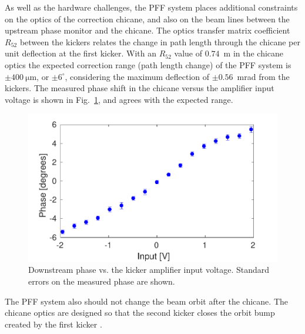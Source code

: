 \documentclass[%
 reprint,
superscriptaddress,
 amsmath,amssymb,
 prl,
]{revtex4-1}
\begin{document}
As well as the hardware challenges, the PFF system places additional 
constraints on the optics of the correction 
chicane, and also on the beam lines between the upstream phase monitor and the 
chicane. %
The optics transfer matrix coefficient \(R_{52}\) between the kickers relates 
the change in path length through the chicane per unit 
deflection at the first kicker. 
With an \(R_{52}\) value of \(0.74\)~m in the chicane optics 
\cite{RobertsThesis} the 
expected
correction range (path length change) of 
the PFF system is \(\pm400~\mathrm{\mu m}\), or \(\pm6^\circ\), considering the 
maximum deflection of \(\pm0.56\)~mrad from the kickers.
The measured phase shift in the chicane versus the amplifier input voltage is 
shown in Fig.~\ref{fig:corrRange}, and agrees with the expected range. 


\begin{figure}
	\includegraphics[width=\columnwidth]{figs/corrRange}
	\caption{\label{fig:corrRange}Downstream phase vs. the kicker amplifier 
	input voltage. Standard errors on the measured phase are shown.}
\end{figure}

The PFF system also should not change the beam orbit after the chicane. 
The chicane optics are designed so that the second kicker closes the orbit 
bump created by the first kicker \cite{RobertsThesis}.
\end{document}
